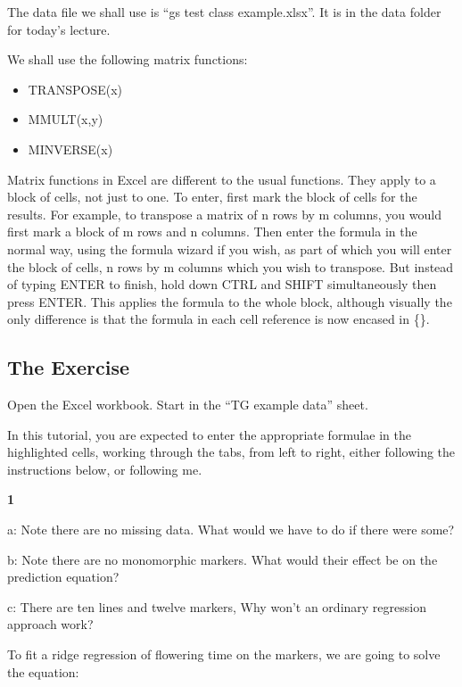\documentclass[
]{book}
\makeatletter
\providecommand{\tightlist}{%
  \setlength{\itemsep}{0pt}\setlength{\parskip}{0pt}}
\newenvironment{kframe}{%
\medskip{}
\setlength{\fboxsep}{.8em}
 \def\at@end@of@kframe{}%
 \ifinner\ifhmode%
  \def\at@end@of@kframe{\end{minipage}}%
  \begin{minipage}{\columnwidth}%
 \fi\fi%
 \def\FrameCommand##1{\hskip\@totalleftmargin \hskip-\fboxsep
 \colorbox{shadecolor}{##1}\hskip-\fboxsep
     \hskip-\linewidth \hskip-\@totalleftmargin \hskip\columnwidth}%
 \MakeFramed {\advance\hsize-\width
   \@totalleftmargin\z@ \linewidth\hsize
   \@setminipage}}%
 {\par\unskip\endMakeFramed%
 \at@end@of@kframe}
\newenvironment{rmdblock}[1]
  {
  \begin{itemize}
  \renewcommand{\labelitemi}{
    \raisebox{-.7\height}[0pt][0pt]{
      {\setkeys{Gin}{width=3em,keepaspectratio}\texttt{[image: images/\#1]}}
    }
  }
  \setlength{\fboxsep}{1em}
  \begin{kframe}
  \item
  }
  {
  \end{kframe}
  \end{itemize}
  }
\newenvironment{rmdquiz}
  {\begin{rmdblock}{quiz}}
  {\end{rmdblock}}
\makeatother
\begin{document}
The data file we shall use is ``gs test class example.xlsx''. It is in the data folder for today's lecture.

We shall use the following matrix functions:

\begin{itemize}
\tightlist
\item
  TRANSPOSE(x)
\item
  MMULT(x,y)
\item
  MINVERSE(x)
\end{itemize}

Matrix functions in Excel are different to the usual functions. They apply to a block of cells, not just to one. To enter, first mark the block of cells for the results. For example, to transpose a matrix of n rows by m columns, you would first mark a block of m rows and n columns. Then enter the formula in the normal way, using the formula wizard if you wish, as part of which you will enter the block of cells, n rows by m columns which you wish to transpose. But instead of typing ENTER to finish, hold down CTRL and SHIFT simultaneously then press ENTER. This applies the formula to the whole block, although visually the only difference is that the formula in each cell reference is now encased in \{\}.

\hypertarget{the-exercise-5}{%
\subsection{The Exercise}\label{the-exercise-5}}

Open the Excel workbook. Start in the ``TG example data'' sheet.

In this tutorial, you are expected to enter the appropriate formulae in the highlighted cells, working through the tabs, from left to right, either following the instructions below, or following me.

\begin{rmdquiz}
\textbf{1}

a: Note there are no missing data. What would we have to do if there were some?

b: Note there are no monomorphic markers. What would their effect be on the prediction equation?

c: There are ten lines and twelve markers, Why won't an ordinary regression approach work?
\end{rmdquiz}

To fit a ridge regression of flowering time on the markers, we are going to solve the equation:
\end{document}
